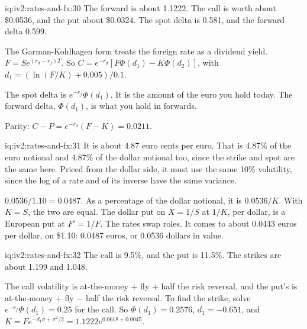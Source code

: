 \begin{solution}{iq:iv2:rates-and-fx:30}
The forward is about 1.1222. The call is worth about \$0.0536, and the put about \$0.0324. The spot delta is 0.581, and the forward delta 0.599.

The Garman-Kohlhagen form treats the foreign rate as a dividend yield. $F = Se^{(r_d - r_f)T}$. So $C = e^{-r_d}[F\Phi(d_1) - K\Phi(d_2)]$, with $d_1 = (\ln(F/K) + 0.005)/0.1$.

The spot delta is $e^{-r_f}\Phi(d_1)$. It is the amount of the euro you hold today. The forward delta, $\Phi(d_1)$, is what you hold in forwards.

Parity: $C - P = e^{-r_d}(F - K) = 0.0211$.

\end{solution}

\begin{solution}{iq:iv2:rates-and-fx:31}
It is about 4.87 euro cents per euro. That is 4.87\% of the euro notional and 4.87\% of the dollar notional too, since the strike and spot are the same here. Priced from the dollar side, it must use the same 10\% volatility, since the log of a rate and of its inverse have the same variance.

$0.0536/1.10 = 0.0487$. As a percentage of the dollar notional, it is $0.0536/K$. With $K = S$, the two are equal. The dollar put on $X = 1/S$ at $1/K$, per dollar, is a European put at $F' = 1/F$. The rates swap roles. It comes to about 0.0443 euros per dollar, on \$1.10: 0.0487 euros, or 0.0536 dollars in value.

\end{solution}

\begin{solution}{iq:iv2:rates-and-fx:32}
The call is 9.5\%, and the put is 11.5\%. The strikes are about 1.199 and 1.048.

The call volatility is at-the-money + fly + half the risk reversal, and the put's is at-the-money + fly $-$ half the risk reversal. To find the strike, solve $e^{-r_f}\Phi(d_1) = 0.25$ for the call. So $\Phi(d_1) = 0.2576$, $d_1 = -0.651$, and $K = Fe^{-d_1\sigma + \sigma^2/2} = 1.1222e^{0.0618 + 0.0045}$.

\end{solution}


